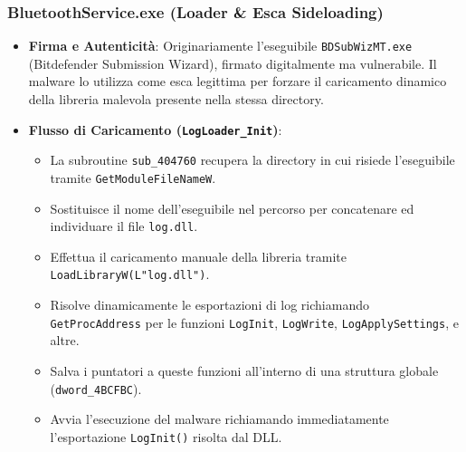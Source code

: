 \subsubsection{BluetoothService.exe (Loader \& Esca Sideloading)}
\begin{itemize}
  \item \textbf{Firma e Autenticità}: Originariamente l'eseguibile \texttt{BDSubWizMT.exe} (Bitdefender Submission Wizard), firmato digitalmente ma vulnerabile. Il malware lo utilizza come esca legittima per forzare il caricamento dinamico della libreria malevola presente nella stessa directory.
  \item \textbf{Flusso di Caricamento (\texttt{LogLoader\_Init})}:
  \begin{itemize}
    \item La subroutine \texttt{sub\_404760} recupera la directory in cui risiede l'eseguibile tramite \texttt{GetModuleFileNameW}.
    \item Sostituisce il nome dell'eseguibile nel percorso per concatenare ed individuare il file \texttt{log.dll}.
    \item Effettua il caricamento manuale della libreria tramite \texttt{LoadLibraryW(L"log.dll")}.
    \item Risolve dinamicamente le esportazioni di log richiamando \texttt{GetProcAddress} per le funzioni \texttt{LogInit}, \texttt{LogWrite}, \texttt{LogApplySettings}, e altre.
    \item Salva i puntatori a queste funzioni all'interno di una struttura globale (\texttt{dword\_4BCFBC}).
    \item Avvia l'esecuzione del malware richiamando immediatamente l'esportazione \texttt{LogInit()} risolta dal DLL.
  \end{itemize}
\end{itemize}

